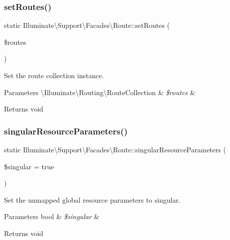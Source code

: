 \subsubsection{\texorpdfstring{set\+Routes()}{setRoutes()}}
{\footnotesize\ttfamily static Illuminate\textbackslash{}\+Support\textbackslash{}\+Facades\textbackslash{}\+Route\+::set\+Routes (\begin{DoxyParamCaption}\item[{}]{\$routes }\end{DoxyParamCaption})\hspace{0.3cm}{\ttfamily [static]}}

Set the route collection instance.


\begin{DoxyParams}[1]{Parameters}
\textbackslash{}\+Illuminate\textbackslash{}\+Routing\textbackslash{}\+Route\+Collection & {\em \$routes} & \\
\hline
\end{DoxyParams}
\begin{DoxyReturn}{Returns}
void 
\end{DoxyReturn}
\mbox{\label{class_illuminate_1_1_support_1_1_facades_1_1_route_a109da236bab9351cc8a449917b32abb7}} 
\subsubsection{\texorpdfstring{singular\+Resource\+Parameters()}{singularResourceParameters()}}
{\footnotesize\ttfamily static Illuminate\textbackslash{}\+Support\textbackslash{}\+Facades\textbackslash{}\+Route\+::singular\+Resource\+Parameters (\begin{DoxyParamCaption}\item[{}]{\$singular = {\ttfamily true} }\end{DoxyParamCaption})\hspace{0.3cm}{\ttfamily [static]}}

Set the unmapped global resource parameters to singular.


\begin{DoxyParams}[1]{Parameters}
bool & {\em \$singular} & \\
\hline
\end{DoxyParams}
\begin{DoxyReturn}{Returns}
void 
\end{DoxyReturn}
\mbox{\label{class_illuminate_1_1_support_1_1_facades_1_1_route_a5a2a3e65c09e2e548773a5513ae4e9f9}} 
